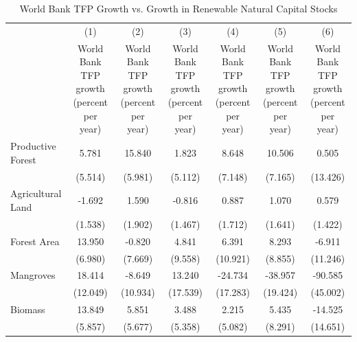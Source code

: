 \begin{table}[htbp]\centering
\def\sym#1{\ifmmode^{#1}\else\(^{#1}\)\fi}
\caption{World Bank TFP Growth vs. Growth in Renewable Natural Capital Stocks}
\begin{tabular}{l*{6}{c}}
\hline\hline
                    &\multicolumn{1}{c}{(1)}&\multicolumn{1}{c}{(2)}&\multicolumn{1}{c}{(3)}&\multicolumn{1}{c}{(4)}&\multicolumn{1}{c}{(5)}&\multicolumn{1}{c}{(6)}\\
                    &\multicolumn{1}{c}{World Bank TFP growth (percent per year)}&\multicolumn{1}{c}{World Bank TFP growth (percent per year)}&\multicolumn{1}{c}{World Bank TFP growth (percent per year)}&\multicolumn{1}{c}{World Bank TFP growth (percent per year)}&\multicolumn{1}{c}{World Bank TFP growth (percent per year)}&\multicolumn{1}{c}{World Bank TFP growth (percent per year)}\\
\hline
Productive Forest   &       5.781       &      15.840       &       1.823       &       8.648       &      10.506       &       0.505       \\
                    &     (5.514)       &     (5.981)       &     (5.112)       &     (7.148)       &     (7.165)       &    (13.426)       \\
[1em]
Agricultural Land   &      -1.692       &       1.590       &      -0.816       &       0.887       &       1.070       &       0.579       \\
                    &     (1.538)       &     (1.902)       &     (1.467)       &     (1.712)       &     (1.641)       &     (1.422)       \\
[1em]
Forest Area         &      13.950       &      -0.820       &       4.841       &       6.391       &       8.293       &      -6.911       \\
                    &     (6.980)       &     (7.669)       &     (9.558)       &    (10.921)       &     (8.855)       &    (11.246)       \\
[1em]
Mangroves           &      18.414       &      -8.649       &      13.240       &     -24.734       &     -38.957       &     -90.585       \\
                    &    (12.049)       &    (10.934)       &    (17.539)       &    (17.283)       &    (19.424)       &    (45.002)       \\
[1em]
Biomass             &      13.849       &       5.851       &       3.488       &       2.215       &       5.435       &     -14.525       \\
                    &     (5.857)       &     (5.677)       &     (5.358)       &     (5.082)       &     (8.291)       &    (14.651)       \\

\end{tabular}
\end{table}

